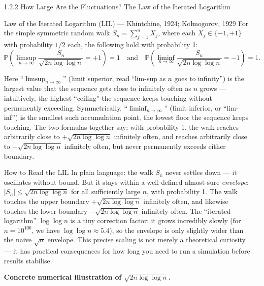 \documentclass[aspectratio=169,10pt]{beamer}
\begin{document}
\begin{frame}[allowframebreaks]{1.2.2 How Large Are the Fluctuations? The Law of the Iterated Logarithm}
  \begin{block}{Law of the Iterated Logarithm (LIL) --- Khintchine, 1924; Kolmogorov, 1929}
    For the simple symmetric random walk $S_n = \sum_{j=1}^n X_j$, where each
    $X_j \in \{-1, +1\}$ with probability $1/2$ each, the following hold with
    probability 1:
    \[
      \mathbb{P}\!\left(
        \limsup_{n \to \infty}
        \frac{S_n}{\sqrt{2n \log \log n}} = +1
      \right) = 1
      \quad\text{and}\quad
      \mathbb{P}\!\left(
        \liminf_{n \to \infty}
        \frac{S_n}{\sqrt{2n \log \log n}} = -1
      \right) = 1.
    \]
  \end{block}

  Here ``$\limsup_{n \to \infty}$'' (limit superior, read ``lim-sup as $n$
  goes to infinity'') is the largest value that the sequence gets close to
  infinitely often as $n$ grows --- intuitively, the highest ``ceiling'' the
  sequence keeps touching without permanently exceeding.  Symmetrically,
  ``$\liminf_{n \to \infty}$'' (limit inferior, or ``lim-inf'') is the
  smallest such accumulation point, the lowest floor the sequence keeps
  touching.  The two formulas together say: with probability 1, the walk
  reaches arbitrarily close to $+\sqrt{2n \log \log n}$ infinitely often, and
  reaches arbitrarily close to $-\sqrt{2n \log \log n}$ infinitely often, but
  never permanently exceeds either boundary.

  \begin{alertblock}{How to Read the LIL}
    In plain language: the walk $S_n$ never settles down --- it oscillates
    without bound.  But it stays within a well-defined almost-sure
    \emph{envelope}: $|S_n| \le \sqrt{2n \log \log n}$ for all sufficiently
    large $n$, with probability 1.  The walk touches the upper boundary
    $+\sqrt{2n \log \log n}$ infinitely often, and likewise touches the lower
    boundary $-\sqrt{2n \log \log n}$ infinitely often.  The ``iterated
    logarithm'' $\log \log n$ is a tiny correction factor: it grows
    incredibly slowly (for $n = 10^{100}$, we have $\log \log n \approx 5.4$),
    so the envelope is only slightly wider than the naive $\sqrt{n}$ envelope.
    This precise scaling is not merely a theoretical curiosity --- it has
    practical consequences for how long you need to run a simulation before
    results stabilise.
  \end{alertblock}

  \framebreak

  \textbf{Concrete numerical illustration of $\sqrt{2n \log \log n}$.}


\end{frame}
\end{document}
